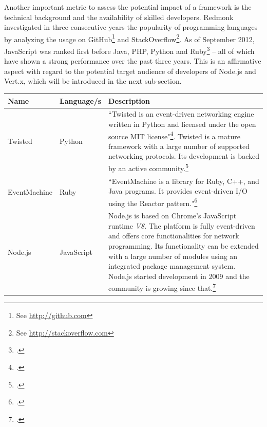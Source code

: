 Another important metric to assess the potential impact of a framework is the
technical background and the availability of skilled developers. Redmonk
investigated in three consecutive years the popularity of programming languages
by analyzing the usage on GitHub\footnote{See \url{http://github.com}} and
StackOverflow\footnote{See \url{http://stackoverflow.com}}. As of September
2012, JavaScript was ranked first before Java, PHP, Python and
Ruby\footcite[Cf.][]{Redmonk_2012} – all of which have shown a strong
performance over the past three years. This is an affirmative aspect with regard
to the potential target audience of developers of Node.js and Vert.x, which will
be introduced in the next sub-section.


\begin{savenotes} %
\begin{table}[htbp]
\begin{tabular*}{\textwidth}{p{} p{} p{}}
\toprule
\textbf{Name} & \textbf{Language/s} & \textbf{Description} \\
\midrule 
Twisted			& Python			& ``Twisted is an event-driven networking engine written in 
									  Python and licensed under the open source MIT license"\footcite[Cf.][]{Twisted_2012}.
									  Twisted is a mature framework with a large number of supported networking
									  protocols. Its development is backed by an active
									  community.\footcite[Cf.][12]{fettig_2005}
									  \\
									  
EventMachine 	& Ruby    			& ``EventMachine is a library for Ruby, C++, and Java
									  programs. It provides event-driven I/O using the Reactor 
									  pattern."\footcite[]{eventmachine_2012}\\

Node.js			& JavaScript		& Node.js is based on Chrome's JavaScript runtime \textit{V8}.
									  The platform is fully event-driven and offers core
									  functionalities for network programming. Its functionality
									  can be extended with a large number of modules using an
									  integrated package management system.
									  Node.js started development in 2009 and the community
									  is growing since that.\footcite[Cf.][]{Mashtable_2011}\\
									  

\end{tabular*}
\end{table}
\end{savenotes}
